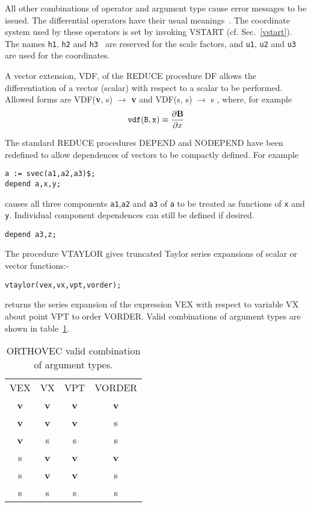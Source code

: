 All other combinations of operator and argument type cause error
messages to be issued.  The differential operators have their usual
meanings~\cite{Speigel:59}.  The coordinate system used by these operators is
set by invoking  VSTART (cf. Sec.~\ref{vstart}).  The names {\tt h1}, 
{\tt h2}  and {\tt h3 } are
reserved for the scale factors, and {\tt u1}, {\tt u2} and {\tt u3} are 
used for the coordinates.

A vector extension, VDF, of the REDUCE procedure DF allows the 
differentiation of a vector (scalar) with respect to a scalar to be
performed.  Allowed forms are 
VDF({\bf v}, s)  $\rightarrow$  {\bf v}   and
VDF(s, s)  $\rightarrow$   s , 
where, for example\\
\begin{eqnarray*}
{\tt vdf( B,x)} \equiv \frac{\partial {\bf B}}{\partial x}
\end{eqnarray*}

The standard REDUCE procedures DEPEND and NODEPEND have been redefined
to allow dependences of vectors to be compactly
defined.  For example  
\begin{verbatim}
a := svec(a1,a2,a3)$;
depend a,x,y;
\end{verbatim}
causes all three components {\tt a1},{\tt a2} and {\tt a3} of {\tt a} 
to be treated as functions of {\tt x} and {\tt y}.
Individual component dependences can still be defined if desired.
\begin{verbatim}
depend a3,z;
\end{verbatim}

The procedure VTAYLOR gives truncated Taylor series expansions of scalar
or vector functions:- 
\begin{verbatim}
vtaylor(vex,vx,vpt,vorder);
\end{verbatim}
returns the series expansion of the expression 
VEX  with respect to variable VX 
about point VPT  to order VORDER.  Valid
combinations of argument types are shown in table~\ref{ORTHOVEC:validexp}. \\

\begin{table}
\begin{center}
\begin{tabular}{cccc}
VEX & VX & VPT &  VORDER \\[2ex]
{\bf v} & {\bf v} &  {\bf v} &  {\bf v}\\
{\bf v} &  {\bf v} & {\bf v} & s\\
{\bf v} & s & s & s \\
s & {\bf v} &  {\bf v} & {\bf v}   \\
s & {\bf v} & {\bf v} & s\\
s & s & s & s\\
\end{tabular}
\end{center}
\caption{ORTHOVEC valid combination of argument types.}\label{ORTHOVEC:validexp}
\end{table}

